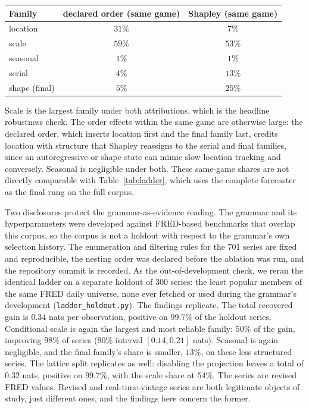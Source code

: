 \documentclass[11pt]{article}
\theoremstyle{remark}
\begin{document}
\begin{center}
\small
\begin{tabular}{lcc}
\toprule
Family & declared order (same game) & Shapley (same game)\\
\midrule
location & $31\%$ & $7\%$\\
scale & $59\%$ & $53\%$\\
seasonal & $1\%$ & $1\%$\\
serial & $4\%$ & $13\%$\\
shape (final) & $5\%$ & $25\%$\\
\bottomrule
\end{tabular}
\end{center}

Scale is the largest family under both attributions, which is the headline robustness check.
The order effects within the same game are otherwise large: the declared order, which
inserts location first and the final family last, credits location with structure that
Shapley reassigns to the serial and final families, since an autoregressive or shape state
can mimic slow location tracking and conversely. Seasonal is negligible under both. These
same-game shares are not directly comparable with Table~\ref{tab:ladder}, which uses the
complete forecaster as the final rung on the full corpus.

Two disclosures protect the grammar-as-evidence reading. The grammar and its hyperparameters
were developed against FRED-based benchmarks that overlap this corpus, so the corpus is not a
holdout with respect to the grammar's own selection history. The enumeration and filtering
rules for the 701 series are fixed and reproducible, the nesting order was declared before
the ablation was run, and the repository commit is recorded. As the out-of-development check,
we reran the identical ladder on a separate holdout of 300 series: the least popular members
of the same FRED daily universe, none ever fetched or used during the grammar's development
(\texttt{ladder\_holdout.py}). The findings replicate. The total recovered gain is $0.34$ nats per observation, positive on $99.7\%$ of the
holdout series. Conditional scale is again the largest and most reliable family: $50\%$ of
the gain, improving $98\%$ of series ($90\%$ interval $[0.14,0.21]$ nats). Seasonal is again negligible, and the final family's share is smaller, $13\%$, on these
less structured series. The lattice split replicates as well: disabling the projection leaves
a total of $0.32$ nats, positive on $99.7\%$, with the scale share at $54\%$. The series are revised FRED values. Revised and real-time-vintage series are both
legitimate objects of study, just different ones, and the findings here concern the former.
\end{document}
